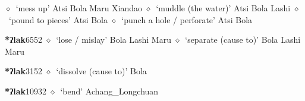 \begin{list}{}{\leftmargin=1.5em \itemindent=-1.5em}
         $\diamond$~`mess up'
         Atsi 
\hspace{1ex}
         Bola 
\hspace{1ex}
         Maru 
\hspace{1ex}
         Xiandao 
\hspace{1ex}
         $\diamond$~`muddle (the water)'
         Atsi 
\hspace{1ex}
         Bola 
\hspace{1ex}
         Lashi 
\hspace{1ex}
         $\diamond$~`pound to pieces'
         Atsi 
\hspace{1ex}
         Bola 
\hspace{1ex}
         $\diamond$~`punch a hole / perforate'
         Atsi 
\hspace{1ex}
         Bola 
  \item {\footnotesize \textbf{*ʔlak}}{\tiny 6552}
\hspace{1ex}
         $\diamond$~`lose / mislay'
         Bola 
\hspace{1ex}
         Lashi 
\hspace{1ex}
         Maru 
\hspace{1ex}
         $\diamond$~`separate (cause to)'
         Bola 
\hspace{1ex}
         Lashi 
\hspace{1ex}
         Maru 
  \item {\footnotesize \textbf{*ʔlak}}{\tiny 3152}
\hspace{1ex}
         $\diamond$~`dissolve (cause to)'
         Bola 
  \item {\footnotesize \textbf{*ʔlak}}{\tiny 10932}
\hspace{1ex}
         $\diamond$~`bend'
         Achang\_Longchuan 

\end{list}
